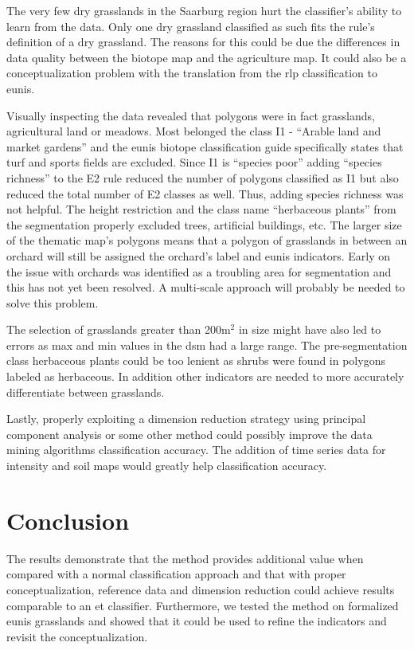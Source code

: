 \documentclass[authoryear,final,12pt,number]{elsarticle}
\begin{document}
The very few dry grasslands in the Saarburg region hurt the classifier's 
ability to learn from the data. Only one dry grassland classified as such fits 
the rule's definition of a dry grassland. The reasons for this could be due the 
differences in data quality between the biotope map and the agriculture map. 
It could also be a conceptualization problem with the translation from the 
\gls{rlp} classification to \gls{eunis}.

Visually inspecting the data revealed that polygons were in fact grasslands, 
agricultural land or meadows. Most belonged the class I1 - ``Arable land and 
market gardens'' and the \gls{eunis} biotope classification guide specifically 
states that turf and sports fields are excluded. Since I1 is ``species poor'' 
adding ``species richness'' to the E2 rule reduced the number of polygons 
classified as I1 but also reduced the total number of E2 classes as well. Thus, 
adding species richness was not helpful. The height restriction and the class 
name ``herbaceous plants'' from the segmentation properly excluded trees, 
artificial buildings, etc. The larger size of the thematic map's polygons means 
that a polygon of grasslands in between an orchard will still be assigned the 
orchard's label and \gls{eunis} indicators. Early on the issue with orchards 
was identified as a troubling area for segmentation and this has not yet been 
resolved. A multi-scale approach will probably be needed to solve this problem. 

The selection of grasslands greater than 200m$^{2}$ in size might have also led 
to errors as max and min values in the \gls{dsm} had a large range. The 
pre-segmentation class herbaceous plants could be too lenient as shrubs were 
found in polygons labeled as herbaceous. In addition other indicators are 
needed to more accurately differentiate between grasslands.

Lastly, properly exploiting a dimension reduction strategy using principal 
component analysis or some other method could possibly improve the data mining 
algorithms classification accuracy. The addition of time series data for 
intensity and soil maps would greatly help classification accuracy.
\section{Conclusion}
The results demonstrate that the method provides additional value when compared 
with a normal classification approach and that with proper conceptualization, 
reference data and dimension reduction could achieve results comparable to an 
\gls{et} classifier. Furthermore, we tested the method on formalized 
\gls{eunis} grasslands and showed that it could be used to refine the 
indicators and revisit the conceptualization. 
\end{document}
